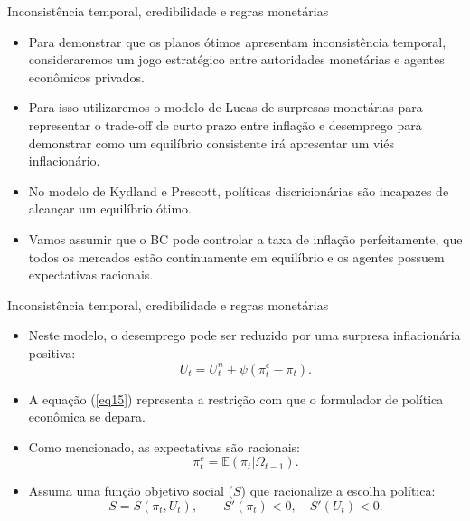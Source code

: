 \documentclass[10pt]{beamer}
\begin{document}
\begin{frame}{Inconsistência temporal, credibilidade e regras monetárias}
    \begin{itemize}
        \item Para demonstrar que os planos ótimos apresentam inconsistência temporal, consideraremos um jogo estratégico entre autoridades monetárias e agentes econômicos privados.
        \bigskip
        \item Para isso utilizaremos o modelo de Lucas de surpresas monetárias para representar o trade-off de curto prazo entre inflação e desemprego para demonstrar como um equilíbrio consistente irá apresentar um viés inflacionário.
        \bigskip
        \item No modelo de Kydland e Prescott, políticas discricionárias são incapazes de alcançar um equilíbrio ótimo.
        \bigskip
        \item Vamos assumir que o BC pode controlar a taxa de inflação perfeitamente, que todos os mercados estão continuamente em equilíbrio e os agentes possuem expectativas racionais.
    \end{itemize}
\end{frame}

\begin{frame}{Inconsistência temporal, credibilidade e regras monetárias}
    \begin{itemize}
        \item Neste modelo, o desemprego pode ser reduzido por uma surpresa inflacionária positiva:
        \begin{equation}
            U_t = U_t^n + \psi(\pi_t^e - \pi_t).
            \label{eq15}
        \end{equation}
        \bigskip
        \item A equação (\ref{eq15}) representa a restrição com que o formulador de política econômica se depara.
        \bigskip
        \item Como mencionado, as expectativas são racionais:
        \[
        \pi_t^e = \mathbb{E}(\pi_t|\Omega_{t-1}).
        \]
        \bigskip
        \item Assuma uma função objetivo social ($S$) que racionalize a escolha política:
        \begin{equation}
            S = S(\pi_t, U_t), \qquad S'(\pi_t)<0, \quad S'(U_t)<0.
            \label{eq16}
        \end{equation}
    \end{itemize}
\end{frame}
\end{document}
